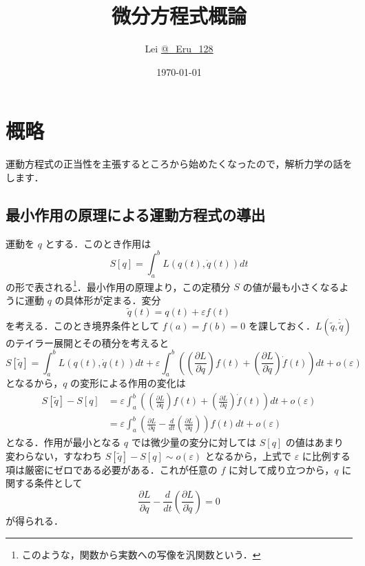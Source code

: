 \documentclass[dvipdfmx, a4paper]{jsarticle}
\title{微分方程式概論}
\author{Lei \href{https://twitter.com/_Eru_128}{@\_Eru\_128}}
\date{\today}
\begin{document}
\maketitle

\section{概略}

運動方程式の正当性を主張するところから始めたくなったので，解析力学の話をします．

\subsection{最小作用の原理による運動方程式の導出}

運動を $q$ とする．このとき作用は
\begin{equation}
    S[q] = \int_a^b L(q(t), \dot q(t))dt
\end{equation}
の形で表される\footnote{このような，関数から実数への写像を汎関数という．}．最小作用の原理より，この定積分 $S$ の値が最も小さくなるように運動 $q$ の具体形が定まる．変分
\begin{equation}
    \tilde{q}(t)=q(t)+\varepsilon f(t)
\end{equation}
を考える．このとき境界条件として $f(a)=f(b)=0$ を課しておく．$L(\tilde{q}, \dot\tilde{q})$ のテイラー展開とその積分を考えると
\begin{equation}
    S[\tilde{q}]=\int_a^b L(q(t), \dot q(t))dt+\varepsilon\int_a^b\left(\left(\frac{\partial L}{\partial q}\right)f(t)+\left(\frac{\partial L}{\partial \dot q}\right)\dot f(t)\right)dt+o(\varepsilon)
\end{equation}
となるから，$q$ の変形による作用の変化は
\begin{align}
    S[\tilde{q}]-S[q]&=\varepsilon\int_a^b\left(\left(\frac{\partial L}{\partial q}\right)f(t)+\left(\frac{\partial L}{\partial \dot q}\right)\dot f(t)\right)dt+o(\varepsilon)\\
    &=\varepsilon\int_a^b\left(\frac{\partial L}{\partial q}-\frac{d}{dt}\left(\frac{\partial L}{\partial \dot q}\right)\right)f(t)dt+o(\varepsilon)
\end{align}
となる．作用が最小となる $q$ では微少量の変分に対しては $S[q]$ の値はあまり変わらない，すなわち $S[\tilde{q}]-S[q]\sim o(\varepsilon)$ となるから，上式で $\varepsilon$ に比例する項は厳密にゼロである必要がある．これが任意の $f$ に対して成り立つから，$q$ に関する条件として
\begin{equation}
    \frac{\partial L}{\partial q}-\frac{d}{dt}\left(\frac{\partial L}{\partial \dot q}\right)=0
\end{equation}
が得られる．
\end{document}
